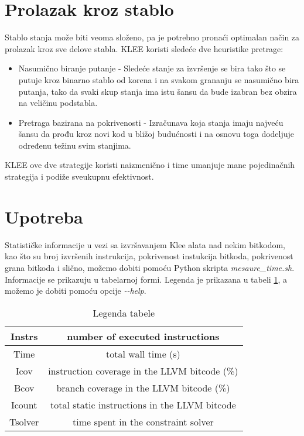 \documentclass[a4paper]{article}
\begin{document}
{\section{Prolazak kroz stablo}
\label{sec:pks}

	Stablo stanja može biti veoma složeno, pa je potrebno pronaći optimalan način za prolazak kroz sve delove stabla. KLEE koristi sledeće dve heuristike pretrage: 
	\begin{itemize}
		\item Nasumično biranje putanje - Sledeće stanje za izvršenje se bira tako što se putuje kroz binarno stablo od korena i na svakom grananju se nasumično bira putanja, tako da svaki skup stanja ima istu šansu da bude izabran bez obzira na veličinu podstabla.  
		\item Pretraga bazirana na pokrivenosti - Izračunava koja stanja imaju najveću šansu da prođu kroz novi kod u bližoj budućnosti i na osnovu toga dodeljuje određenu težinu svim stanjima.
	\end{itemize}

	KLEE ove dve strategije koristi naizmenično i time umanjuje mane pojedinačnih strategija i podiže sveukupnu efektivnost.

\section{Upotreba}
\label{sec:upotreba}

	Statističke informacije u vezi sa izvršavanjem Klee alata nad nekim bitkodom, kao što su broj izvršenih instrukcija, pokrivenost instukcija bitkoda, pokrivenost grana bitkoda i slično, možemo dobiti pomoću Python skripta \textit{mesaure\_time.sh}. Informacije se prikazuju u tabelarnoj formi. Legenda je prikazana u tabeli \ref{tab:legenda}, a možemo je dobiti pomoću opcije \textit{\--\--help}.
	
	\begin{table}[h!]
		\begin{center}
		\begin{tabular}{|c|c|} \hline
		Instrs & number of executed instructions\\ \hline
		Time & total wall time (s) \\ \hline
		Icov & instruction coverage in the LLVM bitcode (\%) \\ \hline
		Bcov &  branch coverage in the LLVM bitcode (\%) \\ \hline
		Icount & total static instructions in the LLVM bitcode \\ \hline
		Tsolver & time spent in the constraint solver\\ \hline
		\end{tabular}
		\caption{Legenda tabele\label{tab:legenda}}	
		\end{center}
	\end{table}
	
}
\end{document}
